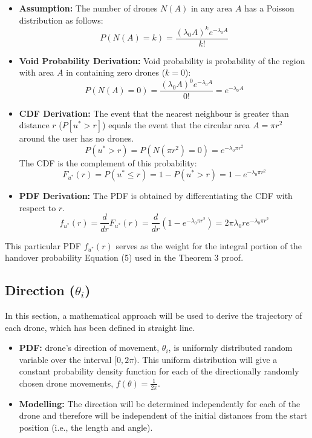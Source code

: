 \documentclass[12pt,a4paper]{article}
\begin{document}
\begin{itemize}
       \item \textbf{Assumption:} The number of drones $N(A)$ in any area $A$ has a Poisson distribution as follows: %
       $$P(N(A)=k) = \frac{(\lambda_0 A)^k e^{-\lambda_0 A}}{k!}$$ %
    
       \item \textbf{Void Probability Derivation:} Void probability is probability of the region with area $A$ in containing zero drones ($k=0$): %
       $$P(N(A)=0) = \frac{(\lambda_0 A)^0 e^{-\lambda_0 A}}{0!} = e^{-\lambda_0 A}$$ %
    
       \item \textbf{CDF Derivation:} %
    The event that the nearest neighbour is greater than distance $r$ ($P[u^*>r]$) equals the event that the circular area $A = \pi r^2$ around the user has no drones.    %
       $$P(u^* > r) = P(N(\pi r^2)=0) = e^{-\lambda_0 \pi r^2}$$ %
       The CDF is the complement of this probability: %
       $$F_{u^*}(r) = P(u^* \leq r) = 1 - P(u^* > r) = 1 - e^{-\lambda_0 \pi r^2}$$ %
    
    \item \textbf{PDF Derivation:} The PDF is obtained by differentiating the CDF with respect to $r$.    %
       $$f_{u^*}(r) = \frac{d}{dr}F_{u^*}(r) = \frac{d}{dr}(1 - e^{-\lambda_0 \pi r^2}) = 2\pi\lambda_0 r e^{-\lambda_0 \pi r^2}$$ %
\end{itemize}
This particular PDF $f_{u^*}(r)$ serves as the weight for the integral portion of the handover probability Equation (5) used in the Theorem 3 proof.    %

   \subsection*{Direction ($\theta_i$)} %
In this section, a mathematical approach will be used to derive the trajectory of each drone, which has been defined in straight line.    %
\begin{itemize}
    \item \textbf{PDF:} drone’s direction of movement, $\theta_i$, is uniformly distributed random variable over the interval $[0,2\pi)$.    %
    This uniform distribution will give a constant probability density function for each of the directionally randomly chosen drone movements, $f(\theta) = \frac{1}{2\pi}$.    %
    \item \textbf{Modelling:} The direction will be determined independently for each of the drone and therefore will be independent of the initial distances from the start position (i.e., the length and angle).    %
\end{itemize}
\end{document}
